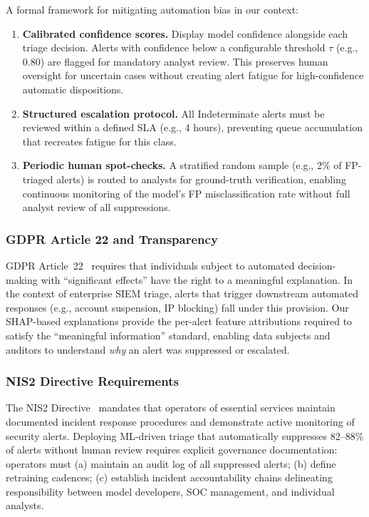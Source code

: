\documentclass[conference]{IEEEtran}
\begin{document}
A formal framework for mitigating automation bias in our context:
\begin{enumerate}
  \item \textbf{Calibrated confidence scores.}
    Display model confidence alongside each triage decision.
    Alerts with confidence below a configurable threshold $\tau$ (e.g., 0.80) are flagged
    for mandatory analyst review.  This preserves human oversight for uncertain cases without
    creating alert fatigue for high-confidence automatic dispositions.
  \item \textbf{Structured escalation protocol.}
    All Indeterminate alerts must be reviewed within a defined SLA (e.g., 4 hours),
    preventing queue accumulation that recreates fatigue for this class.
  \item \textbf{Periodic human spot-checks.}
    A stratified random sample (e.g., 2\% of FP-triaged alerts) is routed to analysts for
    ground-truth verification, enabling continuous monitoring of the model's FP misclassification
    rate without full analyst review of all suppressions.
\end{enumerate}

\subsubsection{GDPR Article 22 and Transparency}
GDPR Article~22~\cite{gdpr2016} requires that individuals subject to automated decision-making
with ``significant effects'' have the right to a meaningful explanation.
In the context of enterprise SIEM triage, alerts that trigger downstream automated responses
(e.g., account suspension, IP blocking) fall under this provision.
Our SHAP-based explanations provide the per-alert feature attributions required to satisfy
the ``meaningful information'' standard, enabling data subjects and auditors to understand
\emph{why} an alert was suppressed or escalated.

\subsubsection{NIS2 Directive Requirements}
The NIS2 Directive~\cite{nis2directive} mandates that operators of essential services maintain
documented incident response procedures and demonstrate active monitoring of security alerts.
Deploying ML-driven triage that automatically suppresses 82--88\% of alerts without human review
requires explicit governance documentation: operators must (a) maintain an audit log of all
suppressed alerts; (b) define retraining cadences; (c) establish incident accountability chains
delineating responsibility between model developers, SOC management, and individual analysts.
\end{document}
